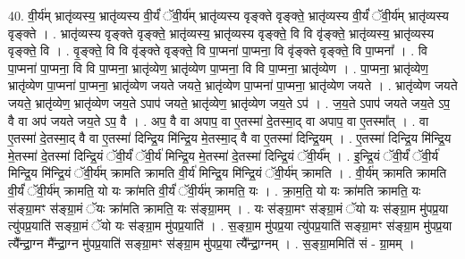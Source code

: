 \documentclass[17pt]{extarticle}
\begin{document}
40. वी॒र्य॑म् भ्रातृ॑व्यस्य॒ भ्रातृ॑व्यस्य वी॒र्यं॑ ॅवी॒र्य॑म् भ्रातृ॑व्यस्य वृङ्क्ते वृङ्क्ते॒ भ्रातृ॑व्यस्य वी॒र्यं॑ ॅवी॒र्य॑म् भ्रातृ॑व्यस्य वृङ्क्ते । . भ्रातृ॑व्यस्य वृङ्क्ते वृङ्क्ते॒ भ्रातृ॑व्यस्य॒ भ्रातृ॑व्यस्य वृङ्क्ते॒ वि वि वृ॑ङ्क्ते॒ भ्रातृ॑व्यस्य॒ भ्रातृ॑व्यस्य वृङ्क्ते॒ वि । . वृ॒ङ्क्ते॒ वि वि वृ॑ङ्क्ते वृङ्क्ते॒ वि पा॒प्मना॑ पा॒प्मना॒ वि वृ॑ङ्क्ते वृङ्क्ते॒ वि पा॒प्मना᳚ । . वि पा॒प्मना॑ पा॒प्मना॒ वि वि पा॒प्मना॒ भ्रातृ॑व्येण॒ भ्रातृ॑व्येण पा॒प्मना॒ वि वि पा॒प्मना॒ भ्रातृ॑व्येण । . पा॒प्मना॒ भ्रातृ॑व्येण॒ भ्रातृ॑व्येण पा॒प्मना॑ पा॒प्मना॒ भ्रातृ॑व्येण जयते जयते॒ भ्रातृ॑व्येण पा॒प्मना॑ पा॒प्मना॒ भ्रातृ॑व्येण जयते । . भ्रातृ॑व्येण जयते जयते॒ भ्रातृ॑व्येण॒ भ्रातृ॑व्येण जय॒ते ऽपाप॑ जयते॒ भ्रातृ॑व्येण॒ भ्रातृ॑व्येण जय॒ते ऽप॑ । . ज॒य॒ते ऽपाप॑ जयते जय॒ते ऽप॒ वै वा अप॑ जयते जय॒ते ऽप॒ वै । . अप॒ वै वा अपाप॒ वा ए॒तस्मा॑ दे॒तस्मा॒द् वा अपाप॒ वा ए॒तस्मा᳚त् । . वा ए॒तस्मा॑ दे॒तस्मा॒द् वै वा ए॒तस्मा॑ दिन्द्रि॒य मि॑न्द्रि॒य मे॒तस्मा॒द् वै वा ए॒तस्मा॑ दिन्द्रि॒यम् । . ए॒तस्मा॑ दिन्द्रि॒य मि॑न्द्रि॒य मे॒तस्मा॑ दे॒तस्मा॑ दिन्द्रि॒यं ॅवी॒र्यं॑ ॅवी॒र्य॑ मिन्द्रि॒य मे॒तस्मा॑ दे॒तस्मा॑ दिन्द्रि॒यं ॅवी॒र्य᳚म् । . इ॒न्द्रि॒यं ॅवी॒र्यं॑ ॅवी॒र्य॑ मिन्द्रि॒य मि॑न्द्रि॒यं ॅवी॒र्य॑म् क्रामति क्रामति वी॒र्य॑ मिन्द्रि॒य मि॑न्द्रि॒यं ॅवी॒र्य॑म् क्रामति । . वी॒र्य॑म् क्रामति क्रामति वी॒र्यं॑ ॅवी॒र्य॑म् क्रामति॒ यो यः क्रा॑मति वी॒र्यं॑ ॅवी॒र्य॑म् क्रामति॒ यः । . क्रा॒म॒ति॒ यो यः क्रा॑मति क्रामति॒ यः स॑ङ्ग्रा॒मꣳ स॑ङ्ग्रा॒मं ॅयः क्रा॑मति क्रामति॒ यः स॑ङ्ग्रा॒मम् । . यः स॑ङ्ग्रा॒मꣳ स॑ङ्ग्रा॒मं ॅयो यः स॑ङ्ग्रा॒म मु॑पप्र॒या त्यु॑पप्र॒याति॑ सङ्ग्रा॒मं ॅयो यः स॑ङ्ग्रा॒म मु॑पप्र॒याति॑ । . स॒ङ्ग्रा॒म मु॑पप्र॒या त्यु॑पप्र॒याति॑ सङ्ग्रा॒मꣳ स॑ङ्ग्रा॒म मु॑पप्र॒या त्यै᳚न्द्रा॒ग्न मै᳚न्द्रा॒ग्न मु॑पप्र॒याति॑ सङ्ग्रा॒मꣳ स॑ङ्ग्रा॒म मु॑पप्र॒या त्यै᳚न्द्रा॒ग्नम् । . स॒ङ्ग्रा॒ममिति॑ सं - ग्रा॒मम् । \newline
\end{document}
